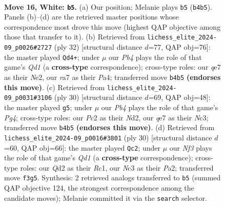 \documentclass[11pt]{article}
\begin{document}
\clearpage

\begin{figure}[p]\centering
\begin{subfigure}{0.46\textwidth}\centering
\resizebox{\linewidth}{!}{%
\newchessgame
\chessboard[
  setfen={1nb2rk1/r3qpp1/pp1p4/4p2p/PP2P1n1/2NB1N2/2PQ1PPP/R4RK1 w - - 0 16},
  showmover=false,
  pgfstyle=straightmove, color=movearrow, markmove={b4-b5}
]}
\caption{}
\end{subfigure}\hfill
\begin{subfigure}{0.46\textwidth}\centering
\resizebox{\linewidth}{!}{%
\newchessgame
\chessboard[
  setfen={r1bq1r2/1p2npk1/p2p2p1/3P3p/Pnp5/2N3PP/1PP1NPB1/R2Q1RK1 w - - 0 17},
  showmover=false,
  pgfstyle=straightmove, color=movearrow, markmove={d1-d4}
]}
\caption{}
\end{subfigure}
\\[4pt]
\begin{subfigure}{0.46\textwidth}\centering
\resizebox{\linewidth}{!}{%
\newchessgame
\chessboard[
  setfen={r2bqrk1/1p3ppn/2pp3p/p3p3/PnP1P1PP/2N1B3/1PPNQP2/2K3RR w - - 2 16},
  showmover=false,
  pgfstyle=straightmove, color=movearrow, markmove={g4-g5}
]}
\caption{}
\end{subfigure}\hfill
\begin{subfigure}{0.46\textwidth}\centering
\resizebox{\linewidth}{!}{%
\newchessgame
\chessboard[
  setfen={r1b2rk1/1p1nqpp1/2n1p2p/2P5/p2pN3/3P1NP1/PP3PBP/2RQR1K1 w - - 3 16},
  showmover=false,
  pgfstyle=straightmove, color=movearrow, markmove={d1-c2}
]}
\caption{}
\end{subfigure}
\caption{\textbf{Move 16, White: \texttt{b5}.} (a) Our position; Melanie plays \texttt{b5} (\texttt{b4b5}). Panels (b)--(d) are the retrieved master positions whose correspondence most drove this move (highest QAP objective among those that transfer to it). (b) Retrieved from \texttt{lichess\_elite\_2024-09\_p0026\#2727} (ply 32) [structural distance $d$=77, QAP obj=76]: the master played \texttt{Qd4+}; under $\mu$ our \emph{Pb4} plays the role of that game's \emph{Qd1} (a \textbf{cross-type} correspondence); cross-type roles: our \emph{q}e7 as their \emph{N}e2, our \emph{r}a7 as their \emph{P}a4; transferred move \texttt{b4b5} \textbf{(endorses this move)}. (c) Retrieved from \texttt{lichess\_elite\_2024-09\_p0031\#3106} (ply 30) [structural distance $d$=69, QAP obj=48]: the master played \texttt{g5}; under $\mu$ our \emph{Pb4} plays the role of that game's \emph{Pg4}; cross-type roles: our \emph{P}c2 as their \emph{N}d2, our \emph{q}e7 as their \emph{N}c3; transferred move \texttt{b4b5} \textbf{(endorses this move)}. (d) Retrieved from \texttt{lichess\_elite\_2024-09\_p0016\#3801} (ply 30) [structural distance $d$=60, QAP obj=66]: the master played \texttt{Qc2}; under $\mu$ our \emph{Nf3} plays the role of that game's \emph{Qd1} (a \textbf{cross-type} correspondence); cross-type roles: our \emph{Q}d2 as their \emph{R}c1, our \emph{N}c3 as their \emph{P}a2; transferred move \texttt{f3g5}. Synthesis: 2 retrieved analogs transferred to \texttt{b5} (summed QAP objective 124, the strongest correspondence among the candidate moves); Melanie committed it via the \texttt{search} selector.}
\label{fig:thought-m30}
\end{figure}
\end{document}
